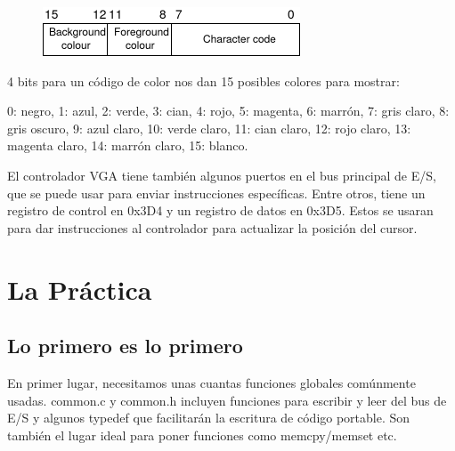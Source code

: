 \documentclass{report}
\begin{document}
\begin{figure}[htb]
\centering
\includegraphics[scale=0.5]{word_format.png}
\end{figure}


4 bits para un c\'odigo de color nos dan 15 posibles colores para mostrar:

0: negro, 1: azul, 2: verde, 3: cian, 4: rojo, 5: magenta, 6: marr\'on, 7: gris claro, 8: gris oscuro, 9: azul claro, 10: verde claro, 11: cian claro, 12: rojo claro, 13: magenta claro, 14: marr\'on claro, 15: blanco.

 
El controlador VGA tiene tambi\'en algunos puertos en el bus principal de E/S, que se puede usar para enviar instrucciones espec\'ificas. Entre otros, tiene un registro de control en 0x3D4 y un registro de datos en 0x3D5. Estos se usaran para dar instrucciones al controlador para actualizar la posici\'on del cursor.

\section{La Pr\'actica}
\subsection{Lo primero es lo primero}
En primer lugar, necesitamos unas cuantas funciones globales com\'unmente usadas. common.c y common.h incluyen funciones para escribir y leer del bus de E/S y algunos typedef que facilitar\'an la escritura de c\'odigo portable. Son tambi\'en el lugar ideal para poner funciones como memcpy/memset etc. 
\end{document}
